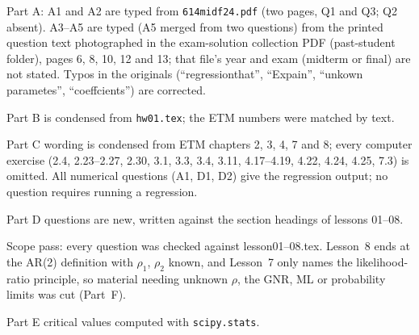 \documentclass[11pt]{article}
\begin{document}
\begin{transcriptnotes}
  \item Part A: A1 and A2 are typed from \texttt{614midf24.pdf} (two pages, Q1 and Q3; Q2 absent).
        A3--A5 are typed (A5 merged from two questions) from the printed question text photographed in
        the exam-solution collection PDF (past-student folder), pages 6, 8, 10, 12 and 13; that file's year and
        exam (midterm or final) are not stated. Typos in the originals (``regressionthat'',
        ``Expain'', ``unkown parametes'', ``coeffcients'') are corrected.
  \item Part B is condensed from \texttt{hw01.tex}; the ETM numbers were matched by text.
  \item Part C wording is condensed from ETM chapters 2, 3, 4, 7 and 8; every computer
        exercise (2.4, 2.23--2.27, 2.30, 3.1, 3.3, 3.4, 3.11, 4.17--4.19, 4.22, 4.24, 4.25,
        7.3) is omitted. All numerical questions (A1, D1, D2) give the regression output;
        no question requires running a regression.
  \item Part D questions are new, written against the section headings of lessons 01--08.
  \item Scope pass: every question was checked against lesson01--08.tex. Lesson~8 ends at
        the AR(2) definition with $\rho_{1}$, $\rho_{2}$ known, and Lesson~7 only names the
        likelihood-ratio principle, so material needing unknown $\rho$, the GNR, ML or
        probability limits was cut (Part~F).
  \item Part E critical values computed with \texttt{scipy.stats}.
\end{transcriptnotes}
\end{document}
